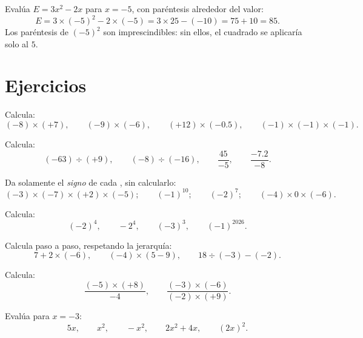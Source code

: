 \begin{example}\label{ex:g8:negprod:substitute}
Evalúa $E = 3x^2 - 2x$ para $x = -5$, con paréntesis alrededor del valor:
\[
E = 3 \times (-5)^2 - 2 \times (-5)
= 3 \times 25 - (-10)
= 75 + 10 = 85 .
\]
Los paréntesis de $(-5)^2$ son imprescindibles: sin ellos, el cuadrado
se aplicaría solo al $5$.
\end{example}

\section{Ejercicios}

\begin{exercise}[$\star$]\label{exo:g8:negprod:1}
Calcula:
\[
(-8) \times (+7), \qquad
(-9) \times (-6), \qquad
(+12) \times (-0.5), \qquad
(-1) \times (-1) \times (-1).
\]
\end{exercise}

\begin{exercise}[$\star$]\label{exo:g8:negprod:2}
Calcula:
\[
(-63) \div (+9), \qquad
(-8) \div (-16), \qquad
\frac{45}{-5}, \qquad
\frac{-7.2}{-8} .
\]
\end{exercise}

\begin{exercise}[$\star$]\label{exo:g8:negprod:3}
Da solamente el \emph{signo} de cada , sin calcularlo:
\[
(-3) \times (-7) \times (+2) \times (-5); \qquad
(-1)^{10}; \qquad
(-2)^{7}; \qquad
(-4) \times 0 \times (-6).
\]
\end{exercise}

\begin{exercise}[$\star$]\label{exo:g8:negprod:4}
Calcula:
\[
(-2)^4, \qquad
-2^4, \qquad
(-3)^3, \qquad
(-1)^{2026} .
\]
\end{exercise}

\begin{exercise}[$\star$]\label{exo:g8:negprod:5}
Calcula paso a paso, respetando la jerarquía:
\[
7 + 2 \times (-6), \qquad
(-4) \times (5 - 9), \qquad
18 \div (-3) - (-2) .
\]
\end{exercise}

\begin{exercise}[$\star$]\label{exo:g8:negprod:6}
Calcula:
\[
\frac{(-5) \times (+8)}{-4}, \qquad
\frac{(-3) \times (-6)}{(-2) \times (+9)} .
\]
\end{exercise}

\begin{exercise}[$\star$]\label{exo:g8:negprod:7}
Evalúa para $x = -3$:
\[
5x, \qquad x^2, \qquad -x^2, \qquad 2x^2 + 4x, \qquad (2x)^2 .
\]
\end{exercise}

